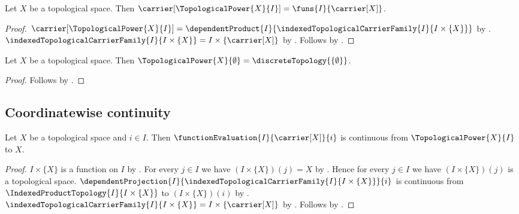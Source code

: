 \begin{proposition}\label{topological_power_carrier}
    Let $X$ be a topological space.
    Then $\carrier[\TopologicalPower{X}{I}]=\funs{I}{\carrier[X]}$.
\end{proposition}
\begin{proof}
    $\carrier[\TopologicalPower{X}{I}]
        =\dependentProduct{I}{\indexedTopologicalCarrierFamily{I}{I\times\{X\}}}$ by
        .
    $\indexedTopologicalCarrierFamily{I}{I\times\{X\}}
        =I\times\{\carrier[X]\}$ by .
    Follows by .
\end{proof}

\begin{theorem}\label{empty_topological_power}
    Let $X$ be a topological space.
    Then $\TopologicalPower{X}{\emptyset}=\discreteTopology{\{\emptyset\}}$.
\end{theorem}
\begin{proof}
    Follows by .
\end{proof}

\subsection{Coordinatewise continuity}

\begin{theorem}\label{topological_power_evaluation}
    Let $X$ be a topological space and $i\in I$.
    Then $\functionEvaluation{I}{\carrier[X]}{i}$ is continuous from
        $\TopologicalPower{X}{I}$ to $X$.
\end{theorem}
\begin{proof}
    $I\times\{X\}$ is a function on $I$ by
        .
    For every $j\in I$ we have $(I\times\{X\})(j)=X$ by
        .
    Hence for every $j\in I$ we have $(I\times\{X\})(j)$ is a topological space.
    $\dependentProjection{I}{\indexedTopologicalCarrierFamily{I}{I\times\{X\}}}{i}$
        is continuous from $\IndexedProductTopology{I}{I\times\{X\}}$
        to $(I\times\{X\})(i)$ by .
    $\indexedTopologicalCarrierFamily{I}{I\times\{X\}}=I\times\{\carrier[X]\}$ by
        .
    Follows by .
\end{proof}

